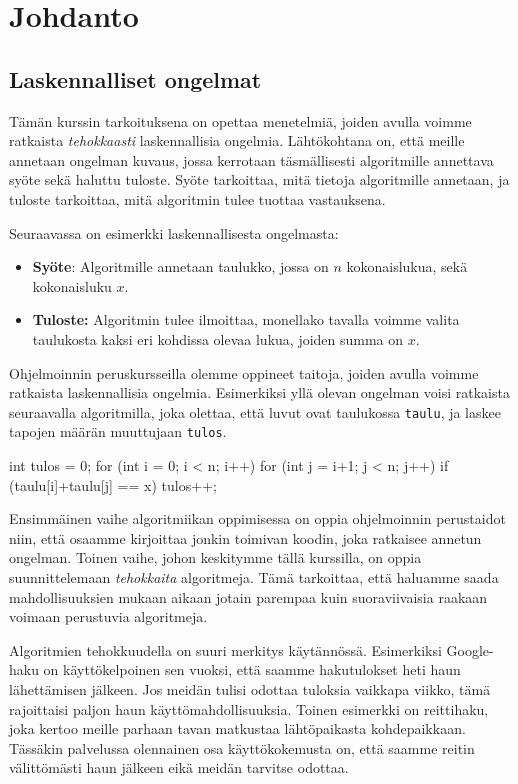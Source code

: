 \chapter{Johdanto}

\section{Laskennalliset ongelmat}

Tämän kurssin tarkoituksena on opettaa menetelmiä,
joiden avulla voimme ratkaista \emph{tehokkaasti}
laskennallisia ongelmia.
Lähtökohtana on, että meille annetaan ongelman kuvaus,
jossa kerrotaan täsmällisesti algoritmille annettava
syöte sekä haluttu tuloste.
Syöte tarkoittaa, mitä tietoja algoritmille annetaan,
ja tuloste tarkoittaa, mitä algoritmin tulee tuottaa vastauksena.

Seuraavassa on esimerkki laskennallisesta ongelmasta:

\begin{itemize}
\item \textbf{Syöte}: Algoritmille annetaan taulukko,
jossa on $n$ kokonaislukua, sekä kokonaisluku $x$.
\item \textbf{Tuloste:} Algoritmin tulee ilmoittaa,
monellako tavalla voimme valita taulukosta kaksi eri
kohdissa olevaa lukua, joiden summa on $x$.
\end{itemize}

Ohjelmoinnin peruskursseilla olemme oppineet taitoja,
joiden avulla voimme ratkaista laskennallisia ongelmia.
Esimerkiksi yllä olevan ongelman voisi ratkaista seuraavalla algoritmilla,
joka olettaa, että luvut ovat taulukossa \texttt{taulu},
ja laskee tapojen määrän muuttujaan \texttt{tulos}.

\begin{code}
int tulos = 0;
for (int i = 0; i < n; i++) {
    for (int j = i+1; j < n; j++) {
        if (taulu[i]+taulu[j] == x) {
            tulos++;
        }
    }
}
\end{code}

Ensimmäinen vaihe algoritmiikan oppimisessa on oppia
ohjelmoinnin perustaidot niin, että osaamme kirjoittaa
jonkin toimivan koodin, joka ratkaisee annetun ongelman.
Toinen vaihe, johon keskitymme tällä kurssilla,
on oppia suunnittelemaan \emph{tehokkaita} algoritmeja.
Tämä tarkoittaa, että haluamme saada mahdollisuuksien mukaan
aikaan jotain parempaa kuin suoraviivaisia
raakaan voimaan perustuvia algoritmeja.

Algoritmien tehokkuudella on suuri merkitys käytännössä.
Esimerkiksi Google-haku on käyttökelpoinen sen vuoksi,
että saamme hakutulokset heti haun lähettämisen jälkeen.
Jos meidän tulisi odottaa tuloksia vaikkapa viikko,
tämä rajoittaisi paljon haun käyttömahdollisuuksia.
Toinen esimerkki on reittihaku, joka kertoo meille parhaan
tavan matkustaa lähtöpaikasta kohdepaikkaan.
Tässäkin palvelussa olennainen osa käyttökokemusta on,
että saamme reitin välittömästi haun jälkeen eikä meidän tarvitse odottaa.

